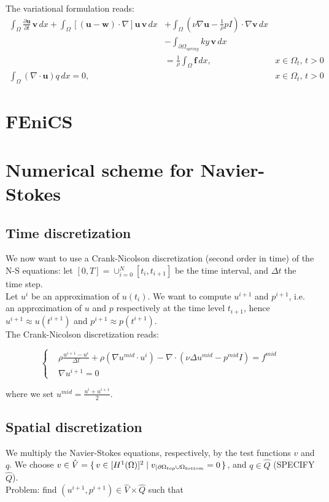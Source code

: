 \documentclass[11pt,a4paper,titlepage]{report}
\begin{document}
The variational formulation reads:
\[
\begin{aligned}
\int_{\Omega} \frac{\partial \mathbf{u}}{\partial t} \, \mathbf{v} \, dx 
+ \int_{\Omega} [(\mathbf{u - w}) \cdot \nabla] \mathbf{u} \, \mathbf{v} \, dx
&+ \int_{\Omega} (\nu \nabla \mathbf{u} -  \frac{1}{\rho}  pI) \cdot \nabla \mathbf{v} \, dx \\
& - \int_{\partial \Omega_{spring}} ky \, \mathbf{v} \, dx \\
& =  \frac{1}{\rho} \int_{\Omega} \mathbf{f} \, dx,  & x \in \Omega_t, \, t>0 \\
\int_{\Omega} ( \nabla \cdot \mathbf{u} ) q \, dx = 0 , & & x \in \Omega_t, \, t>0
\end{aligned}
\]






\section{FEniCS}
\section{Numerical scheme for Navier-Stokes}

\subsection{Time discretization}
We now want to use a Crank-Nicolson discretization (second order in time) of the N-S equations: let $[0, T] = \cup^N_{i=0} [t_i, t_{i+1}] $ be the time interval, and $\Delta t$ the time step. \\
Let $u^i$ be an approximation of $u(t_i)$. We want to compute $u^{i+1}$ and $p^{i+1}$, i.e. an approximation of $u$ and $p$ respectively at the time level $t_{i+1}$, hence $u^{i+1} \approx u(t^{i+1})$ and $p^{i+1} \approx p(t^{i+1})$. \\
The Crank-Nicolson discretization reads:

\[
\left\{  
\begin{aligned}
& \rho \frac{u^{i+1} - u^i}{\Delta t} + \rho (\nabla u^{mid} \cdot u^i) - \nabla \cdot (\nu \Delta u^{mid} - p^{mid}I) = f^{mid} \\
& \nabla u^{i+1} = 0
\end{aligned}
\right.
\]

where we set $u^{mid} = \frac{u^i + u^{i+1}}{2}$.

\subsection{Spatial discretization}
We multiply the Navier-Stokes equations, respectively, by the test functions $v$ and $q$. We choose $v \in \hat{V} = \set{v \in [H^1(\Omega)]^2 | v_|{_{\partial \Omega_{top} \cup \Omega_{bottom}}} = 0}$, and $q \in \hat{Q}$ (SPECIFY $\hat{Q}$). \\
Problem: find $(u^{i+1}, p^{i+1}) \in \hat{V} \times \hat{Q}$ such that 
\end{document}
